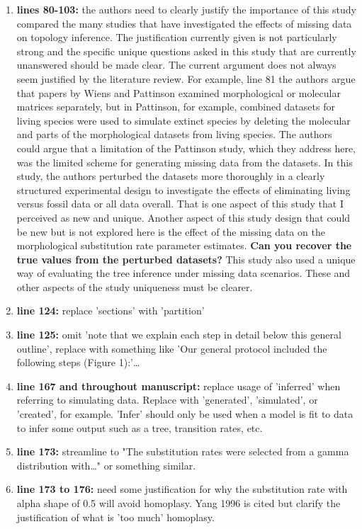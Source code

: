 \documentclass[12pt,letterpaper]{article}
\begin{document}
\begin{enumerate}
\item{\textbf{lines 80-103:}} the authors need to clearly justify the importance of this study compared the many studies that have investigated the effects of missing data on topology inference. The justification currently given is not particularly strong and the specific unique questions asked in this study that are currently unanswered should be made clear. The current argument does not always seem justified by the literature review. For example, line 81 the authors argue that papers by Wiens and Pattinson examined morphological or molecular matrices separately, but in Pattinson, for example, combined datasets for living species were used to simulate extinct species by deleting the molecular and parts of the morphological datasets from living species. The authors could argue that a limitation of the Pattinson study, which they address here, was the limited scheme for generating missing data from the datasets. In this study, the authors perturbed the datasets more thoroughly in a clearly structured experimental design to investigate the effects of eliminating living versus fossil data or all data overall. That is one aspect of this study that I perceived as new and unique. Another aspect of this study design that could be new but is not explored here is the effect of the missing data on the morphological substitution rate parameter estimates. \textbf{Can you recover the true values from the perturbed datasets?} This study also used a unique way of evaluating the tree inference under missing data scenarios. These and other aspects of the study uniqueness must be clearer.
\item{\textbf{line 124:}} replace 'sections' with 'partition'
\item{\textbf{line 125:}} omit 'note that we explain each step in detail below this general outline', replace with something like 'Our general protocol included the following steps (Figure 1):'…
\item{\textbf{line 167 and throughout manuscript:}} replace usage of 'inferred' when referring to simulating data. Replace with 'generated', 'simulated', or 'created', for example. 'Infer' should only be used when a model is fit to data to infer some output such as a tree, transition rates, etc. 
\item{\textbf{line 173:}} streamline to "The substitution rates were selected from a gamma distribution with…" or something similar. 
\item{\textbf{line 173 to 176:}} need some justification for why the substitution rate with alpha shape of 0.5  will avoid homoplasy. Yang 1996 is cited but clarify the justification of what is 'too much' homoplasy. 

\end{enumerate}
\end{document}
